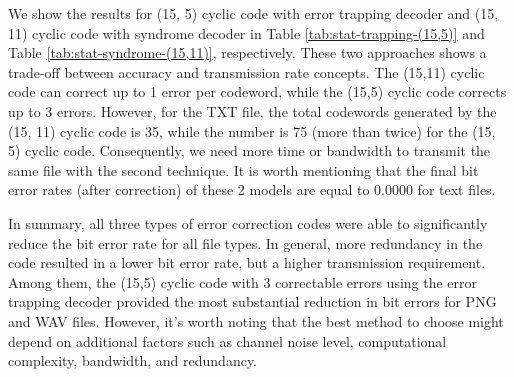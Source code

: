 \documentclass{article}
\begin{document}
We show the results for (15, 5) cyclic code with error trapping decoder and (15, 11) cyclic code with syndrome decoder in Table \ref{tab:stat-trapping-(15,5)} and Table \ref{tab:stat-syndrome-(15,11)}, respectively. 
These two approaches shows a trade-off between accuracy and transmission rate concepts. 
The (15,11) cyclic code can correct up to 1 error per codeword, while the (15,5) cyclic code corrects up to 3 errors. However, for the TXT file, the total codewords generated by the (15, 11) cyclic code is 35, while the number is 75 (more than twice) for the (15, 5) cyclic code. 
Consequently, we need more time or bandwidth to transmit the same file with the second technique. 
It is worth mentioning that the final bit error rates (after correction) of these 2 models are equal to 0.0000 for text files. 

In summary, all three types of error correction codes were able to significantly reduce the bit error rate for all file types. 
In general, more redundancy in the code resulted in a lower bit error rate, but a higher transmission requirement. 
Among them, the (15,5) cyclic code with 3 correctable errors using the error trapping decoder provided the most substantial reduction in bit errors for PNG and WAV files. 
However, it's worth noting that the best method to choose might depend on additional factors such as channel noise level, computational complexity, bandwidth, and redundancy.
\end{document}
